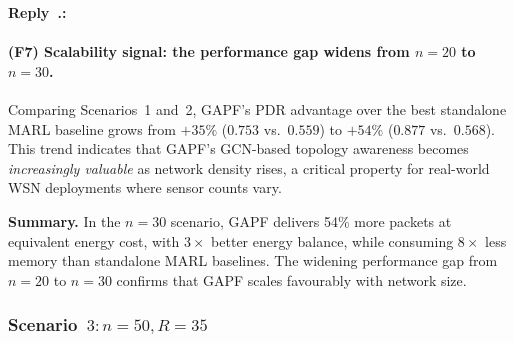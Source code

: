 \documentclass[11pt]{article}
\newcounter{reviewer}
\newcounter{replyctr}[reviewer]
\renewcommand{\thereplyctr}{\thereviewer.\arabic{replyctr}}
\newenvironment{reply}
  {\refstepcounter{replyctr}%
   \addtocounter{replyctr}{-1}%
   \medskip\noindent
   \begin{sf}\textbf{Reply~\thereplyctr:}\ }
  {\addtocounter{replyctr}{1}%
   \medskip\end{sf}}
\begin{document}
\begin{refsection}
\begin{mdframed}[style=Resp]
\begin{reply}
\paragraph{(F7) Scalability signal: the performance gap widens from $n=20$ to $n=30$.}
Comparing Scenarios~1 and~2, GAPF's PDR advantage over the best standalone MARL baseline grows from $+35\%$ ($0.753$ vs.\ $0.559$) to $+54\%$ ($0.877$ vs.\ $0.568$). This trend indicates that GAPF's GCN-based topology awareness becomes \emph{increasingly valuable} as network density rises, a critical property for real-world WSN deployments where sensor counts vary.

\medskip
\noindent\textbf{Summary.} In the $n=30$ scenario, GAPF delivers 54\% more packets at equivalent energy cost, with $3\times$ better energy balance, while consuming $8\times$ less memory than standalone MARL baselines. The widening performance gap from $n=20$ to $n=30$ confirms that GAPF scales favourably with network size.


\subsubsection{Scenario~$3: n = 50, R = 35$}
\label{sec:results_n50_r35}

\begin{center}
\label{tab:perf_n50_r35}
\end{center}


\end{reply}
\end{mdframed}
\end{refsection}
\end{document}
